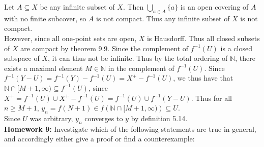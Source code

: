 \documentclass[a4paper]{article}
\begin{document}
Let $A \subseteq X$ be any infinite subset of $X$. Then
$\bigcup_{a \in A} \{a\}$ is an open covering of $A$ with no finite subcover,
so $A$ is not compact. Thus any infinite subset of $X$ is not compact.\\
 However, since all one-point sets are open, $X$ is
Hausdorff. Thus all closed subsets of $X$ are compact by theorem 9.9. Since
the complement of $f^{-1}(U)$ is a closed subspace of $X$, it can thus not be infinite. Thus by
the total ordering of $\mathbb{N}$, there exists a maximal element $M \in \mathbb{N}$ in the
complement of
$f^{-1}(U)$. Since
$f^{-1}\left( Y-U \right) = f^{-1}(Y) - f^{-1}(U) = X^{+} - f^{-1}(U)$, we thus
have that $\mathbb{N} \cap [M+1, \infty) \subseteq f^{-1}(U)$, since
$X^{+} = f^{-1}(U) \cup X^{+} - f^{-1}(U) = f^{-1}(U) \cup f^{-1}\left( Y-U
\right) $. Thus for all $n \ge M+1$, $y_n = f(N+1) \in f \left( 
\mathbb{N} \cap [M +1, \infty) \right) \subseteq U$.\\
Since $U$ was arbitrary, $y_n$ converges to $y$ by definition 5.14.\\
\linebreak
\textbf{Homework 9:} Investigate which of the following statements are true in
general, and accordingly either give a proof or find a counterexample:
\end{document}
